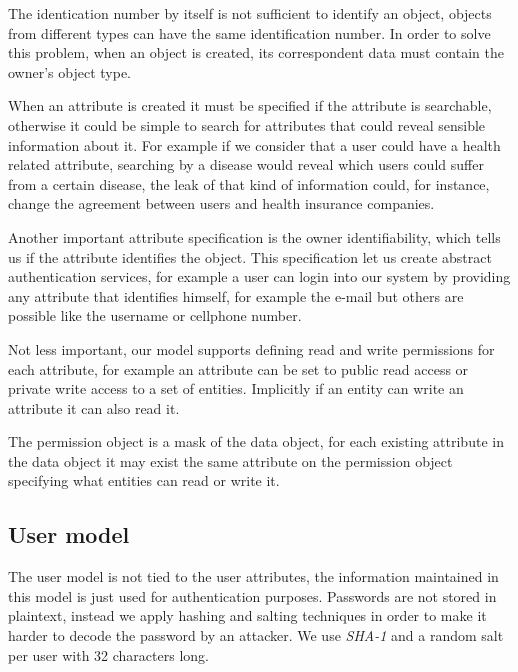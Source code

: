 The identication number by itself is not sufficient to identify an object, objects from different types can have the same identification number. In order to solve this problem, when an object is created, its correspondent data must contain the owner's object type. 

When an attribute is created it must be specified if the attribute is searchable, otherwise it could be simple to search for attributes that could reveal sensible information about it. For example if we consider that a user could have a health related attribute, searching by a disease would reveal which users could suffer from a certain disease, the leak of that kind of information could, for instance, change the agreement between users and health insurance companies.

Another important attribute specification is the owner identifiability, which tells us if the attribute identifies the object. This specification let us create abstract authentication services, for example a user can login into our system by providing any attribute that identifies himself, for example the e-mail but others are possible like the username or cellphone number. 


Not less important, our model supports defining read and write permissions for each attribute, for example an attribute can be set to public read access or private write access to a set of entities. Implicitly if an entity can write an attribute it can also read it.

The permission object is a mask of the data object, for each existing attribute in the data object it may exist the same attribute on the permission object specifying what entities can read or write it.

\subsection{User model}

The user model is not tied to the user attributes, the information maintained in this model is just used for authentication purposes. Passwords are not stored in plaintext, instead we apply hashing and salting techniques \cite{password} in order to make it harder to decode the password by an attacker. We use \emph{SHA-1} and a random salt per user with 32 characters long.

